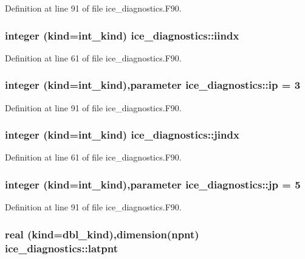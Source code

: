 Definition at line 91 of file ice\_\-diagnostics.F90.\hypertarget{namespaceice__diagnostics_a1a0b626616a7d9a32101d00161d2b574}{
\subsubsection[{iindx}]{\setlength{\rightskip}{0pt plus 5cm}integer (kind=int\_\-kind) {\bf ice\_\-diagnostics::iindx}}}
\label{namespaceice__diagnostics_a1a0b626616a7d9a32101d00161d2b574}


Definition at line 61 of file ice\_\-diagnostics.F90.\hypertarget{namespaceice__diagnostics_a7effd9287958acac49fd0283763b7bee}{
\subsubsection[{ip}]{\setlength{\rightskip}{0pt plus 5cm}integer (kind=int\_\-kind),parameter {\bf ice\_\-diagnostics::ip} = 3}}
\label{namespaceice__diagnostics_a7effd9287958acac49fd0283763b7bee}


Definition at line 91 of file ice\_\-diagnostics.F90.\hypertarget{namespaceice__diagnostics_ae14da62eafd352886088d4688a3a2129}{
\subsubsection[{jindx}]{\setlength{\rightskip}{0pt plus 5cm}integer (kind=int\_\-kind) {\bf ice\_\-diagnostics::jindx}}}
\label{namespaceice__diagnostics_ae14da62eafd352886088d4688a3a2129}


Definition at line 61 of file ice\_\-diagnostics.F90.\hypertarget{namespaceice__diagnostics_a10a3f8830dada38c8bc78c01adf3e435}{
\subsubsection[{jp}]{\setlength{\rightskip}{0pt plus 5cm}integer (kind=int\_\-kind),parameter {\bf ice\_\-diagnostics::jp} = 5}}
\label{namespaceice__diagnostics_a10a3f8830dada38c8bc78c01adf3e435}


Definition at line 91 of file ice\_\-diagnostics.F90.\hypertarget{namespaceice__diagnostics_a098c8da869ccfcbbd1ed9aea5124ee59}{
\subsubsection[{latpnt}]{\setlength{\rightskip}{0pt plus 5cm}real (kind=dbl\_\-kind),dimension({\bf npnt}) {\bf ice\_\-diagnostics::latpnt}}}
\label{namespaceice__diagnostics_a098c8da869ccfcbbd1ed9aea5124ee59}


